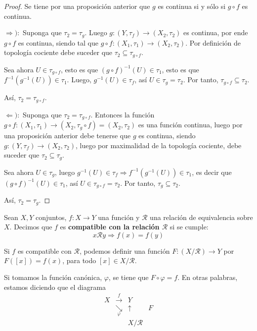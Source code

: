 \documentclass[12pt]{report}
\theoremstyle{largebreak}
\newcommand\cf[3]{\ensuremath{#1:#2\rightarrow#3}}
\begin{document}
    \begin{proof}
        Se tiene por una proposición anterior que $g$ es continua si y sólo si $g\circ f$ es continua.

        $\Rightarrow):$ Suponga que $\tau_2=\tau_g$. Luego $\cf{g}{(Y,\tau_f)}{(X_2,\tau_2)}$ es continua, por ende $g\circ f$ es continua, siendo tal que $\cf{g\circ f}{(X_1,\tau_1)}{(X_2,\tau_2)}$. Por definición de topología cociente debe suceder que $\tau_2\subseteq\tau_{g\circ f}$.

        Sea ahora $U\in\tau_{g\circ f}$, esto es que $(g\circ f)^{-1}(U)\in\tau_1$, esto es que $f^{-1}(g^{-1}(U))\in\tau_1$. Luego, $g^{-1}(U)\in\tau_f$, así $U\in\tau_g=\tau_2$. Por tanto, $\tau_{g\circ f}\subseteq\tau_2$.

        Así, $\tau_2=\tau_{g\circ f}$.

        $\Leftarrow):$ Suponga que $\tau_2=\tau_{g\circ f}$. Entonces la función $\cf{g\circ f}{(X_1,\tau_1)}{(X_2,\tau_g\circ f)=(X_2,\tau_2)}$ es una función continua, luego por una proposición anterior debe tenerse que $g$ es continua, siendo $\cf{g}{(Y,\tau_f)}{(X_2,\tau_2)}$, luego por maximalidad de la topología cociente, debe suceder que $\tau_2\subseteq\tau_g$.
        
        Sea ahora $U\in\tau_g$, luego $g^{-1}(U)\in\tau_f\Rightarrow f^{-1}(g^{-1}(U))\in\tau_1$, es decir que $(g\circ f)^{-1}(U)\in\tau_1$, así $U\in\tau_{ g\circ f}=\tau_2$. Por tanto, $\tau_g\subseteq\tau_2$.

        Así, $\tau_2=\tau_g$.
    \end{proof}

    \begin{mydef}
        Sean $X,Y$ conjuntos, $\cf{f}{X}{Y}$ una función y $\mathcal{R}$ una relación de equivalencia sobre $X$. Decimos que $f$ es \textbf{compatible con la relación $\mathcal{R}$} si se cumple:
        \begin{equation*}
            x\mathcal{R}y\Rightarrow f(x)=f(y)
        \end{equation*}
    \end{mydef}

    \begin{obs}
        Si $f$ es compatible con $\mathcal{R}$, podemos definir una función $\cf{F}{(X/\mathcal{R})}{Y}$ por $F([x])=f(x)$, para todo $[x]\in X/\mathcal{R}$.

        Si tomamos la función canónica, $\varphi$, se tiene que $F\circ\varphi=f$. En otras palabras, estamos diciendo que el diagrama
        \begin{equation*}
            \begin{array}{cccl}
                X & \overset{f}{\longrightarrow} & Y & \\
                & \underset{\varphi}{\searrow} & \uparrow & F \\
                & & X/\mathcal{R} & \\
            \end{array}
        \end{equation*}
    \end{obs}
\end{document}
